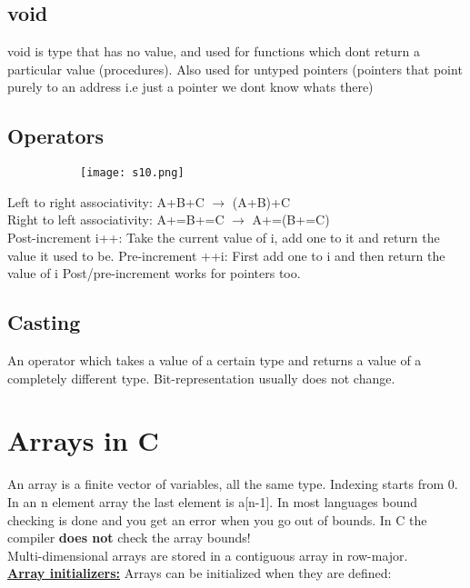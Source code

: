 \documentclass[8pt]{extreport}
\begin{document}
\subsection{void}

void is type that has no value, and used for functions which dont return a particular value (procedures). Also used for untyped pointers (pointers that point purely to an address i.e just a pointer we dont know whats there)

\subsection{Operators}
\begin{figure}[H]
\centering
\begin{subfigure}[b]{0.4\linewidth}
\texttt{[image: s10.png]}
\end{subfigure}
\end{figure}
Left to right associativity: A+B+C $\to$ (A+B)+C\\
Right to left associativity: A+=B+=C $\to$ A+=(B+=C)\\
Post-increment i++: Take the current value of i, add one to it and return the value it used to be.
Pre-increment ++i: First add one to i and then return the value of i
Post/pre-increment works for pointers too.

\subsection{Casting}
An operator which takes a value of a certain type and returns a value of a completely different type. Bit-representation usually does not change.

\section{Arrays in C}

An array is a finite vector of variables, all the same type. Indexing starts from 0. In an n element array the last element is a[n-1]. In most languages bound checking is done and you get an error when you go out of bounds. In C the compiler \textbf{ does not } check the array bounds!\\
Multi-dimensional arrays are stored in a contiguous array in row-major.\\

\textbf{\underline{Array initializers:}} Arrays can be initialized when they are defined:
\end{document}
